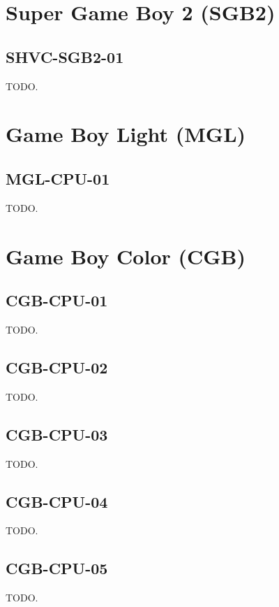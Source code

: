 \section{Super Game Boy 2 (SGB2)}

\subsection{SHVC-SGB2-01}

TODO.

\section{Game Boy Light (MGL)}

\subsection{MGL-CPU-01}

TODO.

\section{Game Boy Color (CGB)}

\subsection{CGB-CPU-01}

TODO.

\subsection{CGB-CPU-02}

TODO.

\subsection{CGB-CPU-03}

TODO.

\subsection{CGB-CPU-04}

TODO.

\subsection{CGB-CPU-05}

TODO.

